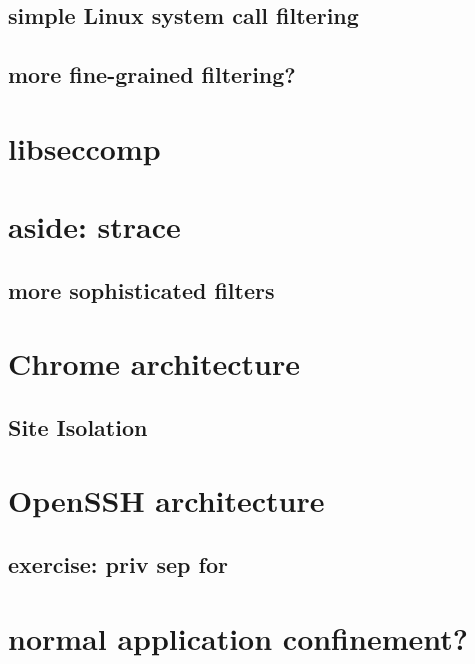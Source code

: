 \subsection{simple Linux system call filtering}


\subsection{more fine-grained filtering?}






\section{libseccomp}


\section{aside: strace}



\subsection{more sophisticated filters}
\section{Chrome architecture}


\subsection{Site Isolation}


\section{OpenSSH architecture}


\subsection{exercise: priv sep for}


\section{normal application confinement?}



